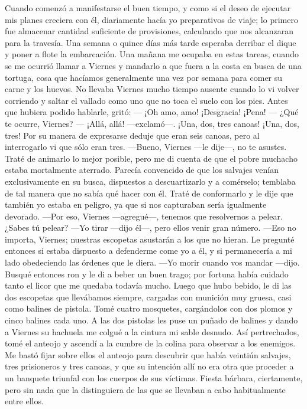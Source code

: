 \documentclass{novela}
\begin{document}
    Cuando comenzó a manifestarse el buen tiempo, y como si el deseo de ejecutar mis planes creciera con él, diariamente hacía yo preparativos de viaje; lo primero fue almacenar cantidad suficiente de provisiones, calculando que nos alcanzaran para la travesía. Una semana o quince días más tarde esperaba derribar el dique y poner a flote la embarcación.
    Una mañana me ocupaba en estas tareas, cuando se me ocurrió llamar a Viernes y mandarlo a que fuera a la costa en busca de una tortuga, cosa que hacíamos generalmente una vez por semana para comer su carne y los huevos. No llevaba Viernes mucho tiempo ausente cuando lo vi volver corriendo y saltar el vallado como uno que no toca el suelo con los pies. Antes que hubiera podido hablarle, gritó: — ¡Oh amo, amo! ¡Desgracia! ¡Pena! — ¿Qué te ocurre, Viernes? — ¡Allá, allá! —exclamó—. ¡Una, dos, tres canoas! ¡Una, dos, tres!
    Por su manera de expresarse deduje que eran seis canoas, pero al interrogarlo vi que sólo eran tres.
    —Bueno, Viernes —le dije—, no te asustes.
    Traté de animarlo lo mejor posible, pero me di cuenta de que el pobre muchacho estaba mortalmente aterrado. Parecía convencido de que los salvajes venían exclusivamente en su busca, dispuestos a descuartizarlo y a comérselo; temblaba de tal manera que no sabía qué hacer con él. Traté de conformarlo y le dije que también yo estaba en peligro, ya que si nos capturaban sería igualmente devorado.
    —Por eso, Viernes —agregué—, tenemos que resolvernos a pelear. ¿Sabes tú pelear?
    —Yo tirar —dijo él—, pero ellos venir gran número.
    —Eso no importa, Viernes; nuestras escopetas asustarán a los que no hieran.
    Le pregunté entonces si estaba dispuesto a defenderme come yo a él, y si permanecería a mi lado obedeciendo las órdenes que le diera.
    —Yo morir cuando vos mandar —dijo.
    Busqué entonces ron y le di a beber un buen trago; por fortuna había cuidado tanto el licor que me quedaba todavía mucho. Luego que hubo bebido, le di las dos escopetas que llevábamos siempre, cargadas con munición muy gruesa, casi como balines de pistola. Tomé cuatro mosquetes, cargándolos con dos plomos y cinco balines cada uno. A las dos pistolas les puse un puñado de balines y dando a Viernes su hachuela me colgué a la cintura mi sable desnudo.
    Así pertrechados, tomé el anteojo y ascendí a la cumbre de la colina para observar a los enemigos. Me bastó fijar sobre ellos el anteojo para descubrir que había veintiún salvajes, tres prisioneros y tres canoas, y que su intención allí no era otra que proceder a un banquete triunfal con los cuerpos de sus víctimas. Fiesta bárbara, ciertamente, pero sin nada que la distinguiera de las que se llevaban a cabo habitualmente entre ellos.
\end{document}
